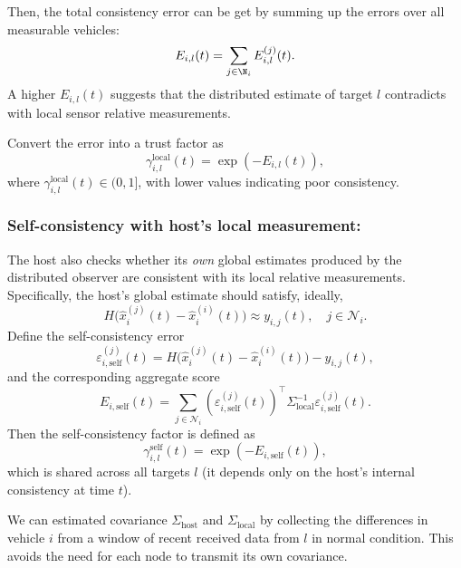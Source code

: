 Then, the total consistency error can be get by summing up the errors over all measurable vehicles:
\begin{equation} 
    E_{i,l}(t) = \sum_{j \in \N_i} E_{i,l}^{(j)}(t).
\end{equation}
A higher $E_{i,l}(t)$  suggests that the distributed estimate of target $l$ contradicts with local sensor relative measurements.

Convert the error into a trust factor as
\begin{equation}
    \gamma_{i,l}^{\text{local}}(t) = \exp\left( -{E_{i,l}(t)} \right),
\end{equation}
where $\gamma_{i,l}^{\text{local}}(t) \in (0, 1]$, with lower values indicating poor consistency. 

\subsubsection{Self-consistency with host's local measurement:}
The host also checks whether its \emph{own} global estimates produced by the distributed observer are consistent with its local relative measurements. Specifically, the host's global estimate should satisfy, ideally,
\begin{equation*}
    H\big(\hat{x}_i^{(j)}(t) - \hat{x}_i^{(i)}(t)\big) \approx y_{i,j}(t),\quad j\in\mathcal{N}_i.
\end{equation*}
Define the self-consistency error
\begin{equation}
    \varepsilon_{i,\text{self}}^{(j)}(t) = H\big(\hat{x}_i^{(j)}(t) - \hat{x}_i^{(i)}(t)\big) - y_{i,j}(t),
\end{equation}
and the corresponding aggregate score
\begin{equation}
    E_{i,\text{self}}(t) = \sum_{j\in\mathcal{N}_i} (\varepsilon_{i,\text{self}}^{(j)}(t))^{\top}\Sigma_{\text{local}}^{-1}\varepsilon_{i,\text{self}}^{(j)}(t).
\end{equation}
Then the self-consistency factor is defined as
\begin{equation}
    \gamma_{i,l}^{\text{self}}(t) = \exp\left(-E_{i,\text{self}}(t)\right),
\end{equation}
which is shared across all targets $l$ (it depends only on the host's internal consistency at time $t$).
\begin{remark}
We can estimated covariance $\Sigma_{\text{host}}$ and $\Sigma_{\text{local}}$ by collecting the differences in vehicle \(i\) from a window of recent received data from \(l\) in normal condition.
This avoids the need for each node to transmit its own covariance.
\end{remark}
\vspace*{-0.3cm}
